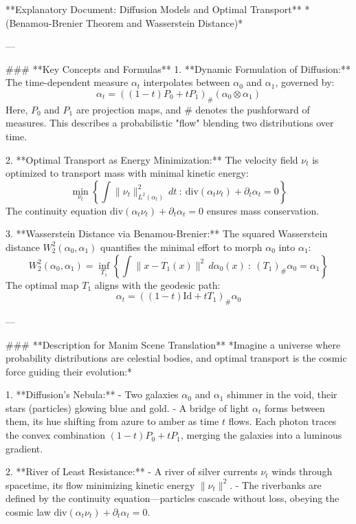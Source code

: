 **Explanatory Document: Diffusion Models and Optimal Transport**  
*(Benamou-Brenier Theorem and Wasserstein Distance)*  

---

### **Key Concepts and Formulas**  
1. **Dynamic Formulation of Diffusion:**  
   The time-dependent measure \( \alpha_t \) interpolates between \( \alpha_0 \) and \( \alpha_1 \), governed by:  
   \[
   \alpha_t = \left( (1 - t)P_0 + tP_1 \right)_\# (\alpha_0 \otimes \alpha_1)
   \]  
   Here, \( P_0 \) and \( P_1 \) are projection maps, and \( \# \) denotes the pushforward of measures. This describes a probabilistic "flow" blending two distributions over time.  

2. **Optimal Transport as Energy Minimization:**  
   The velocity field \( \nu_t \) is optimized to transport mass with minimal kinetic energy:  
   \[
   \min_{\nu_t} \left\{ \int \|\nu_t\|_{L^2(\alpha_t)}^2 \, dt \ : \ \text{div}(\alpha_t \nu_t) + \partial_t \alpha_t = 0 \right\}
   \]  
   The continuity equation \( \text{div}(\alpha_t \nu_t) + \partial_t \alpha_t = 0 \) ensures mass conservation.  

3. **Wasserstein Distance via Benamou-Brenier:**  
   The squared Wasserstein distance \( W_2^2(\alpha_0, \alpha_1) \) quantifies the minimal effort to morph \( \alpha_0 \) into \( \alpha_1 \):  
   \[
   W_2^2(\alpha_0, \alpha_1) = \inf_{T_1} \left\{ \int \|x - T_1(x)\|^2 \, d\alpha_0(x) \ : \ (T_1)_\# \alpha_0 = \alpha_1 \right\}
   \]  
   The optimal map \( T_1 \) aligns with the geodesic path:  
   \[
   \alpha_t = \left( (1 - t)\text{Id} + tT_1 \right)_\# \alpha_0
   \]  

---

### **Description for Manim Scene Translation**  
*Imagine a universe where probability distributions are celestial bodies, and optimal transport is the cosmic force guiding their evolution:*  

1. **Diffusion’s Nebula:**  
   - Two galaxies \( \alpha_0 \) and \( \alpha_1 \) shimmer in the void, their stars (particles) glowing blue and gold.  
   - A bridge of light \( \alpha_t \) forms between them, its hue shifting from azure to amber as time \( t \) flows. Each photon traces the convex combination \( (1 - t)P_0 + tP_1 \), merging the galaxies into a luminous gradient.  

2. **River of Least Resistance:**  
   - A river of silver currents \( \nu_t \) winds through spacetime, its flow minimizing kinetic energy \( \|\nu_t\|^2 \).  
   - The riverbanks are defined by the continuity equation—particles cascade without loss, obeying the cosmic law \( \text{div}(\alpha_t \nu_t) + \partial_t \alpha_t = 0 \).  

